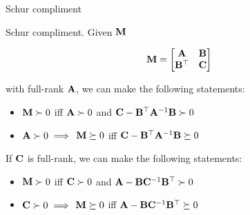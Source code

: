 \documentclass{beamer}
\begin{document}
\begin{frame}{Schur compliment}
	\begin{flushleft}
		
		Schur compliment. Given $\mathbf{M}$
		
		\begin{equation}
			\mathbf{M} = 
			\begin{bmatrix}
				\mathbf{A} & \mathbf{B} \\
				\mathbf{B}^\top & \mathbf{C}
			\end{bmatrix}
		\end{equation}
		
		with full-rank $\mathbf{A}$, we can make the following statements:
		
		\begin{itemize}
			\item $\mathbf{M} \succ 0$ iff $\mathbf{A} \succ 0$ and $\mathbf{C} - \mathbf{B}^\top\mathbf{A}^{-1}\mathbf{B} \succ 0$
			\item $\mathbf{A} \succ 0 \implies$ $\mathbf{M} \succeq 0$ iff $\mathbf{C} - \mathbf{B}^\top\mathbf{A}^{-1}\mathbf{B} \succeq 0$
		\end{itemize}
		
		\bigskip
		
		If $\mathbf{C}$ is full-rank, we can make the following statements:
		
		\begin{itemize}
			\item $\mathbf{M} \succ 0$ iff $\mathbf{C} \succ 0$ and $\mathbf{A} - \mathbf{B}\mathbf{C}^{-1}\mathbf{B}^\top \succ 0$
			\item $\mathbf{C} \succ 0 \implies$ $\mathbf{M} \succeq 0$ iff $\mathbf{A} - \mathbf{B}\mathbf{C}^{-1}\mathbf{B}^\top \succeq 0$
		\end{itemize}		
		
		
		
	\end{flushleft}
\end{frame}
\end{document}
